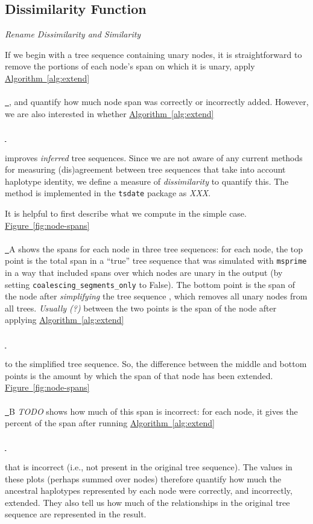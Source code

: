 \documentclass[10pt,twoside,lineno]{gsajnl}
\newcommand{\msprime}{\texttt{msprime}}
\newcommand{\comment}[1]{{\color{violet} \it #1}}
\newcommand{\algorithmref}[2][]{%
	\hyperref[{#2}]{%
		Algorithm~\ref*{#2}%
		\ifx\\#1\\%
		\else
		\,#1%
		\fi
	}%
}
\newcommand*{\figref}[2][]{%
	\hyperref[{#2}]{%
		Figure~\ref*{#2}%
		\ifx\\#1\\%
		\else
		\,#1%
		\fi
	}%
}
\begin{document}

\subsection{Dissimilarity Function}

\comment{Rename Dissimilarity and Similarity}

If we begin with a tree sequence containing unary nodes,
it is straightforward to remove the portions of each node's span on which it is unary,
apply \algorithmref{alg:extend},
and quantify how much node span was correctly or incorrectly added.
However, we are also interested in whether \algorithmref{alg:extend}
improves \emph{inferred} tree sequences.
Since we are not aware of any current methods for measuring (dis)agreement between tree sequences
that take into account haplotype identity,
we define a measure of \emph{dissimilarity} to quantify this.
The method is implemented in the \texttt{tsdate} package \citep{wohns2022unified}
as \comment{XXX}.

It is helpful to first describe what we compute in the simple case.
\figref{fig:node-spans}A shows the spans for each node in three tree sequences:
for each node, the top point is the total span in a ``true'' tree sequence
that was simulated with \msprime \citep{kelleher2016efficient,baumdicker2021efficient}
in a way that included spans over which nodes are unary in the output
(by setting \texttt{coalescing\_segments\_only} to False).
The bottom point is the span of the node after \emph{simplifying} the tree sequence
\citep{kelleher2018efficient},
which removes all unary nodes from all trees.
\comment{Usually (?)} between the two points
is the span of the node after applying \algorithmref{alg:extend}
to the simplified tree sequence.
So, the difference between the middle and bottom points is the amount by which
the span of that node has been extended.
\figref{fig:node-spans}B \comment{TODO} shows how much of this span is incorrect:
for each node, it gives the percent of the span after running \algorithmref{alg:extend}
that is incorrect (i.e., not present in the original tree sequence).
The values in these plots (perhaps summed over nodes)
therefore quantify how much the ancestral haplotypes represented by each node
were correctly, and incorrectly, extended.
They also tell us how much of the relationships in the original tree sequence
are represented in the result.
\end{document}
